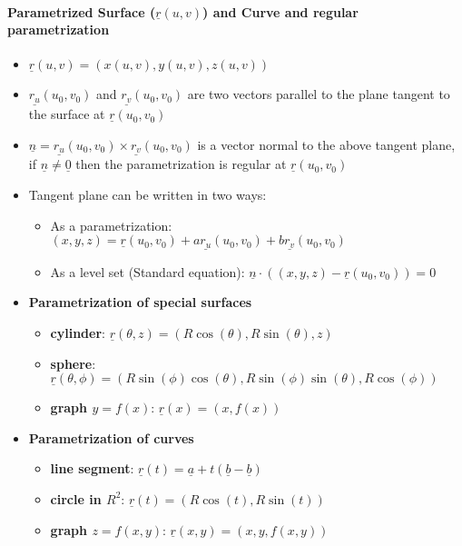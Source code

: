 \documentclass[8pt, twocolumn]{article}
\begin{document}
\paragraph{Parametrized Surface ($\underline{r}(u, v)$) and Curve and regular parametrization}
\begin{itemize}
	\item $\underline{r}(u, v) = (x(u, v), y(u, v), z(u, v))$
	\item $\underline{r_u}(u_0, v_0)$ and $\underline{r_v}(u_0, v_0)$ are two vectors parallel to the plane tangent to the surface at $\underline{r}(u_0, v_0)$
	\item  $\underline{n} =\underline{r_u}(u_0, v_0) \times \underline{r_v}(u_0, v_0)$ is a vector normal to the above tangent plane, if $\underline{n} \neq \underline{0}$ then the parametrization is regular at $\underline{r}(u_0, v_0)$
	\item Tangent plane can be written in two ways: 
	\begin{itemize}
		\item As a parametrization: $(x, y, z) = \underline{r}(u_0, v_0) + a\underline{r_u}(u_0, v_0) + b\underline{r_v}(u_0, v_0)$
		\item As a level set (Standard equation): $\underline{n} \cdot ((x, y, z) - \underline{r}(u_0, v_0)) = 0$
	\end{itemize}	
	\item \textbf{Parametrization of special surfaces}	
	\begin{itemize}
		\item \textbf{cylinder}: $\underline{r}(\theta, z) = (R\cos(\theta), R\sin(\theta), z)$
		\item \textbf{sphere}: $\underline{r}(\theta, \phi) = (R\sin(\phi)\cos(\theta), R\sin(\phi)\sin(\theta), R\cos(\phi))$
		\item \textbf{graph $y = f(x)$}: $\underline{r}(x) = (x, f(x))$
	\end{itemize}
	\item \textbf{Parametrization of curves}	
	\begin{itemize}
		\item \textbf{line segment}: $\underline{r}(t) = \underline{a} + t(\underline{b} - \underline{b})$
		\item \textbf{circle in $R^2$}: $\underline{r}(t) = (R\cos(t), R\sin(t))$
		\item \textbf{graph $z = f(x, y)$}: $\underline{r}(x, y) = (x, y, f(x, y))$
	\end{itemize}

\end{itemize}
\end{document}
